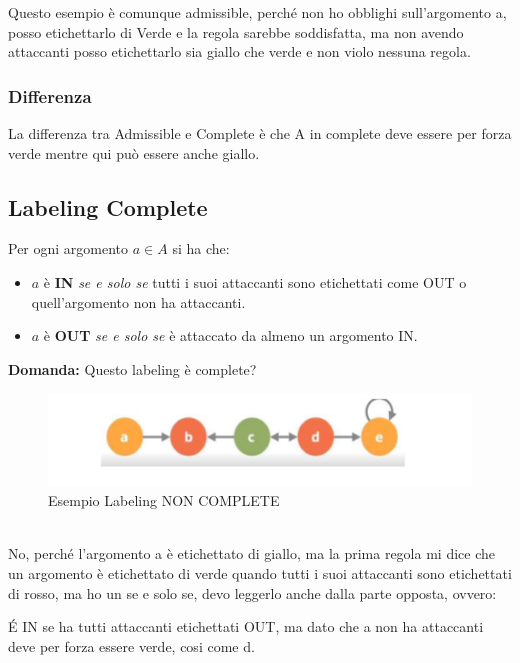     Questo esempio è comunque admissible, perché non ho obblighi sull'argomento
    a, posso etichettarlo di Verde e la regola sarebbe soddisfatta, ma non
    avendo attaccanti posso etichettarlo sia giallo che verde e non violo
    nessuna regola.

    \subsubsection{\textbf{Differenza}} La differenza tra Admissible e Complete
    è che A in complete deve essere per forza verde mentre qui può essere anche
    giallo.
    \newpage
    \subsection{Labeling Complete}
    Per ogni argomento $a \in A$ si ha che:
    \begin{itemize}
        \item  $a$ è \textbf{IN} \textit{se e solo se} tutti i suoi attaccanti
              sono etichettati come OUT o quell'argomento non ha attaccanti.
        \item $a$ è \textbf{OUT} \textit{se e solo se} è attaccato da almeno un
              argomento IN.
    \end{itemize}
    \textbf{Domanda: } Questo labeling è complete?
    \begin{figure}[htp]
        \centering
        \includegraphics[width=12cm, keepaspectratio]{img/Cap7/LC.png}
        \caption{Esempio Labeling NON COMPLETE}
    \end{figure}
    \\No, perché l'argomento a è etichettato di giallo, ma la prima regola mi
    dice che un argomento è etichettato di verde quando tutti i suoi attaccanti
    sono etichettati di rosso, ma ho un se e solo se, devo leggerlo anche dalla
    parte opposta, ovvero:

    \vspace{0.3cm}
    \noindent É IN se ha tutti attaccanti etichettati OUT, ma dato che a non ha
    attaccanti deve per forza essere verde, cosi come d.

    \vspace{0.3cm}

